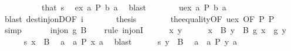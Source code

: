 \begin{isabellebody}
\ \ \isamarkupfalse%
\ {\isacharminus}{\kern0pt}\isanewline
\ \ \ \ \isamarkupfalse%
\ that\ s\ \isamarkupfalse%
\ ex{}{\isacharcolon}{\kern0pt}\ {\isachardoublequoteopen}{\isasymexists}a{\isachardot}{\kern0pt}\ {\isacharquery}{\kern0pt}P\ b\ a{\isachardoublequoteclose}\ \isamarkupfalse%
\ blast\isanewline
\ \ \ \ \isamarkupfalse%
\ \isamarkupfalse%
\ uex{}{\isacharcolon}{\kern0pt}\ {\isachardoublequoteopen}{\isasymexists}{\isacharbang}{\kern0pt}a{\isachardot}{\kern0pt}\ {\isacharquery}{\kern0pt}P\ b\ a{\isachardoublequoteclose}\ \isamarkupfalse%
\ {\isacharparenleft}{\kern0pt}blast\ dest{\isacharcolon}{\kern0pt}inj{\isacharunderscore}{\kern0pt}onD{\isacharbrackleft}{\kern0pt}OF\ i{\isacharbrackright}{\kern0pt}{\isacharparenright}{\kern0pt}\isanewline
\ \ \ \ \isamarkupfalse%
\ \isamarkupfalse%
\ {\isacharquery}{\kern0pt}thesis\isanewline
\ \ \ \ \ \ \isamarkupfalse%
\ the{}{\isacharunderscore}{\kern0pt}equality{\isacharbrackleft}{\kern0pt}OF\ uex{}{\isacharcomma}{\kern0pt}\ OF\ P{\isacharbrackright}{\kern0pt}\ P\ \isamarkupfalse%
\ simp\isanewline
\ \ \isamarkupfalse%
\isanewline
\ \ \isamarkupfalse%
\ {\isachardoublequoteopen}inj{\isacharunderscore}{\kern0pt}on\ {\isacharquery}{\kern0pt}g\ B{\isachardoublequoteclose}\isanewline
\ \ \isamarkupfalse%
\ {\isacharparenleft}{\kern0pt}rule\ inj{\isacharunderscore}{\kern0pt}onI{\isacharparenright}{\kern0pt}\isanewline
\ \ \ \ \isamarkupfalse%
\ x\ y\isanewline
\ \ \ \ \isamarkupfalse%
\ {\isachardoublequoteopen}x\ {\isasymin}\ B{\isachardoublequoteclose}\ {\isachardoublequoteopen}y\ {\isasymin}\ B{\isachardoublequoteclose}\ {\isachardoublequoteopen}{\isacharquery}{\kern0pt}g\ x\ {\isacharequal}{\kern0pt}\ {\isacharquery}{\kern0pt}g\ y{\isachardoublequoteclose}\isanewline
\ \ \ \ \isamarkupfalse%
\ s\ {\isacartoucheopen}x\ {\isasymin}\ B{\isacartoucheclose}\ \isamarkupfalse%
\ a{}\ \ a{}{\isacharcolon}{\kern0pt}\ {\isachardoublequoteopen}{\isacharquery}{\kern0pt}P\ x\ a{}{\isachardoublequoteclose}\ \isamarkupfalse%
\ blast\isanewline
\ \ \ \ \isamarkupfalse%
\ s\ {\isacartoucheopen}y\ {\isasymin}\ B{\isacartoucheclose}\ \isamarkupfalse%
\ a{}\ \ a{}{\isacharcolon}{\kern0pt}\ {\isachardoublequoteopen}{\isacharquery}{\kern0pt}P\ y\ a{}{\isachardoublequoteclose}\ \isamarkupfalse%

\end{isabellebody}
